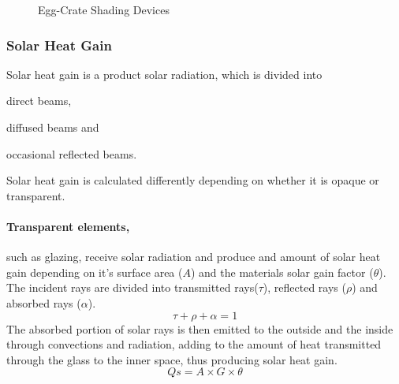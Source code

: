 \documentclass[a4paper,twoside,12pt,openright,final,oldfontcommands]{memoir}
\begin{document}
\begin{enumerate}
\begin{figure}[htbp]
\caption[Egg-Crate Shading Devices]{Egg-Crate Shading Devices \cite{szokolay08}}
\label{EggCrate}
\end{figure}
\end{enumerate}

\subsubsection{Solar Heat Gain}
Solar heat gain is a product solar radiation, which is divided into 
\begin{inparaenum}
	\item direct beams, 
	\item diffused beams and 
	\item occasional reflected beams.
\end{inparaenum}
Solar heat gain is calculated differently depending on whether it is opaque or transparent.

\paragraph{Transparent elements,}such as glazing, receive solar radiation and produce and
amount of solar heat gain depending on it's surface area ($A$) and the materials solar gain
factor ($\theta$). The incident rays are divided into transmitted rays($\tau$), reflected rays
($\rho$) and absorbed rays ($\alpha$).
\begin{equation}
\tau + \rho + \alpha = 1
\end{equation}
The absorbed portion of solar rays is then emitted to the outside and the inside through convections
and radiation, adding to the amount of heat transmitted through the glass to the inner space, thus
producing solar heat gain.
\begin{equation}
Qs=A\times G\times \theta \label{TransHeatGain}
\end{equation}
\end{document}
